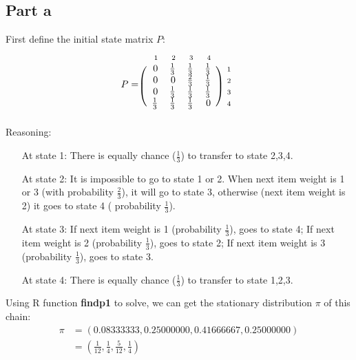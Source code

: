 \documentclass[11pt]{article}
\newcommand{\matindex}[1]{\mbox{\scriptsize#1}}
\begin{document}
\subsection*{Part a}
First define the initial state matrix $P$:
\[
  P=\begin{blockarray}{c@{\hspace{5pt}}rrrr@{\hspace{5pt}}cl}
    & \matindex{1} & \matindex{2} & \matindex{3} & \matindex{4} & & \\
    \begin{block}{(c@{\hspace{5pt}}rrrr@{\hspace{5pt}}c)l}
      & 0 &  \frac{1}{3} & \frac{1}{3} & \frac{1}{3} & & \matindex{1} \\
      & 0 &  0 & \frac{2}{3} & \frac{1}{3} & & \matindex{2} \\
      & 0 &  \frac{1}{3} & \frac{1}{3} & \frac{1}{3} & & \matindex{3} \\
      & \frac{1}{3} &  \frac{1}{3} & \frac{1}{3} & 0 & & \matindex{4} \\
    \end{block}
  \end{blockarray}
\]
Reasoning:
\begin{itemize}
\item[At state 1:] There is equally chance ($\frac{1}{3}$) to transfer to state 2,3,4.
\item[At state 2:] It is impossible to go to state 1 or 2. When next item weight is 1 or 3 (with probability $\frac{2}{3}$), it will go to state 3, otherwise (next item weight is 2) it goes to state 4 ( probability $\frac{1}{3}$).
\item[At state 3:] If next item weight is 1 (probability $\frac{1}{3}$), goes to state 4; If next item weight is 2 (probability $\frac{1}{3}$), goes to state 2; If next item weight is 3 (probability $\frac{1}{3}$), goes to state 3.
\item[At state 4:] There is equally chance ($\frac{1}{3}$) to transfer to state 1,2,3.
\end{itemize}

Using R function \textbf{findp1} to solve, we can get the stationary distribution $\pi$ of this chain:
\begin{align*}
\pi &= (0.08333333, 0.25000000, 0.41666667, 0.25000000) \\
&= (\frac{1}{12},\frac{1}{4},\frac{5}{12},\frac{1}{4})
\end{align*}
\end{document}
